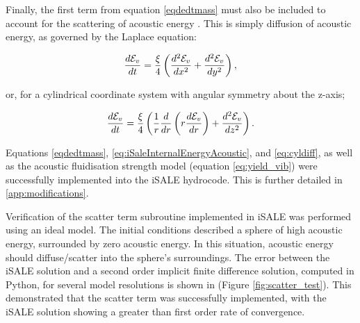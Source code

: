 Finally, the first term from equation \ref{eqdedtmass} must also be included to account for the scattering of acoustic energy \citep{collins2002numerical}. This is simply diffusion of acoustic energy, as governed by the Laplace equation:

\begin{equation} \label{eq:xydiff}
\frac{d \mathcal{E}_{v} }{d t} = \frac{\xi}{4} \left( \frac{d^{2} \mathcal{E}_{v}}{d x^{2}} +\frac{d^{2} \mathcal{E}_{v}}{d y^{2}} \right),\vspace{0.2cm}
\end{equation}

or, for a cylindrical coordinate system with angular symmetry about the z-axis;

\begin{equation} \label{eq:cyldiff}
\frac{d \mathcal{E}_{v} }{d t} = \frac{\xi}{4}  \left( \frac{1}{r} \frac{d}{dr} \left( r \frac{d \mathcal{E}_{v}}{dr} \right) + \frac{d^{2} \mathcal{E}_{v}}{dz^{2}}   \right) .\vspace{0.2cm}
\end{equation} 

Equations \ref{eqdedtmass}, \ref{eq:iSaleInternalEnergyAcoustic}, and \ref{eq:cyldiff}, as well as the acoustic fluidisation strength model (equation \ref{eq:yield_vib}) were successfully implemented into the iSALE hydrocode. This is further detailed in \ref{app:modifications}.

Verification of the scatter term subroutine implemented in iSALE was performed using an ideal model. The initial conditions described a sphere of high acoustic energy, surrounded by zero acoustic energy. In this situation, acoustic energy should diffuse/scatter into the sphere's surroundings. The error between the iSALE solution and a second order implicit finite difference solution, computed in Python, for several model resolutions is shown in (Figure \ref{fig:scatter_test}). This demonstrated that the scatter term was successfully implemented, with the iSALE solution showing a greater than first order rate of convergence.

